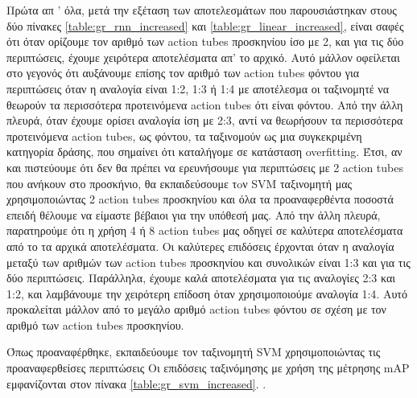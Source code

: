 Πρώτα απ ' όλα, μετά την εξέταση των αποτελεσμάτων που παρουσιάστηκαν στους δύο πίνακες \ref{table:gr_rnn_increased} και \ref{table:gr_linear_increased},
είναι σαφές ότι όταν ορίζουμε τον αριθμό των \en action tubes \gr προσκηνίου ίσο με 2, και για
τις δύο περιπτώσεις, έχουμε χειρότερα αποτελέσματα απ' το αρχικό. Αυτό μάλλον οφείλεται στο γεγονός
ότι αυξάνουμε επίσης τον αριθμό των \en action tubes \gr φόντου για περιπτώσεις όταν η αναλογία είναι 1:2,
1:3 ή 1:4 με αποτέλεσμα  οι ταξινομητέ να θεωρούν τα περισσότερα προτεινόμενα \en action tubes \gr ότι είναι φόντου.
Από την άλλη πλευρά, όταν έχουμε ορίσει αναλογία ίση με 2:3, αντί να θεωρήσουν τα περισσότερα προτεινόμενα \en action tubes, \gr
ως φόντου, τα ταξινομούν ως μια συγκεκριμένη κατηγορία δράσης, που σημαίνει ότι καταλήγομε σε κατάσταση \en overfitting\gr.
Έτσι, αν και πιστεύουμε ότι δεν θα πρέπει να ερευνήσουμε για περιπτώσεις με 2 \en action tubes \gr που ανήκουν στο προσκήνιο,
θα εκπαιδεύσουμε τoν \en SVM  \gr ταξινομητή μας  χρησιμοποιώντας 2 \en action tubes \gr προσκηνίου και όλα τα προαναφερθέντα
ποσοστά επειδή θέλουμε να είμαστε βέβαιοι για την υπόθεσή μας. Από την άλλη πλευρά,
παρατηρούμε ότι η χρήση 4 ή 8 \en action tubes \gr μας οδηγεί σε καλύτερα αποτελέσματα από το
τα αρχικά αποτελέσματα. Οι καλύτερες επιδόσεις έρχονται όταν η αναλογία μεταξύ των αριθμών των \en action tubes \gr  προσκηνίου και συνολικών
 είναι 1:3 και για τις δύο περιπτώσεις. Παράλληλα, έχουμε καλά αποτελέσματα για τις αναλογίες 2:3 και 1:2, και
λαμβάνουμε την χειρότερη επίδοση όταν  χρησιμοποιούμε αναλογία 1:4. Αυτό προκαλείται μάλλον από το μεγάλο
αριθμό \en action tubes \gr φόντου σε σχέση με τον αριθμό των \en action tubes \gr προσκηνίου.\par
Όπως προαναφέρθηκε, εκπαιδεύουμε τον  ταξινομητή \en  SVM \gr χρησιμοποιώντας τις προαναφερθείσες περιπτώσεις
Οι επιδόσεις ταξινόμησης με χρήση της μέτρησης \en mAP \gr εμφανίζονται στον πίνακα \ref{table:gr_svm_increased}. .

